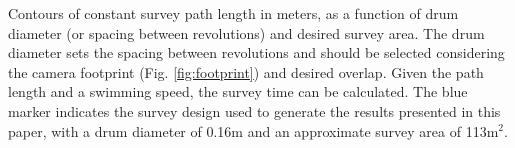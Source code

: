 \label{fig:survey_length} Contours of constant survey path length in meters, as a function of drum diameter (or spacing between revolutions) and desired survey area. The drum diameter sets the spacing between revolutions and should be selected considering the camera footprint (Fig. \ref{fig:footprint}) and desired overlap. Given the path length and a swimming speed, the survey time can be calculated. The blue marker indicates the survey design used to generate the results presented in this paper, with a drum diameter of 0.16m and an approximate survey area of 113m$^2$.